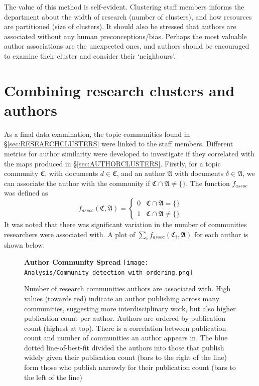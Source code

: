 The value of this method is self-evident. Clustering staff members informs the department about the width of research (number of clusters), and how resources are partitioned (size of clusters). It should also be stressed that authors are associated without any human preconceptions/bias. Perhaps the most valuable author associations are the unexpected ones, and authors should be encouraged to examine their cluster and consider their `neighbours'.
\section{Combining research clusters and authors}
As a final data examination, the topic communities found in  \S\ref{sec:RESEARCHCLUSTERS} were linked to the staff members. Different metrics for author similarity were developed to investigate if they correlated with the maps produced in \S\ref{sec:AUTHORCLUSTERS}.
Firstly, for a topic community $\mathfrak{C}$, with documents $d \in \mathfrak{C}$, and an author $\mathfrak{A}$ with documents $\delta \in \mathfrak{A}$, we can associate the author with the community if $\mathfrak{C} \cap \mathfrak{A} \neq \{ \}$. The function $f_{assoc}$ was defined as 
\[ 
f_{assoc}\left( \mathfrak{C} , \mathfrak{A} \right) = \begin{cases} 
      0 & \mathfrak{C} \cap \mathfrak{A} = \{ \} \\
      1 & \mathfrak{C} \cap \mathfrak{A} \neq \{ \} 
   \end{cases}
\]
It was noted that there was significant variation in the number of communities researchers were associated with. A plot of $\sum_i f_{assoc} \left( \mathfrak{C}_i , \mathfrak{A} \right)$ for each author is shown below:
\begin{center}
\begin{figure}[H]
  \centering
  \textbf{Author Community Spread}
    \texttt{[image: Analysis/Community\_detection\_with\_ordering.png]}
    \caption[Author Community Spread]{Number of research communities authors are associated with. High values (towards red) indicate an author publishing across many communities, suggesting more interdisciplinary work, but also higher publication count per author. Authors are ordered by publication count (highest at top). There is a correlation between publication count and number of communities an author appears in. The blue dotted line-of-best-fit divided the authors into those that publish widely given their publication count (bars to the right of the line) form those who publish narrowly for their publication count (bars to the left of the line)}
\label{fig:commbar}
\end{figure} 
\end{center}
